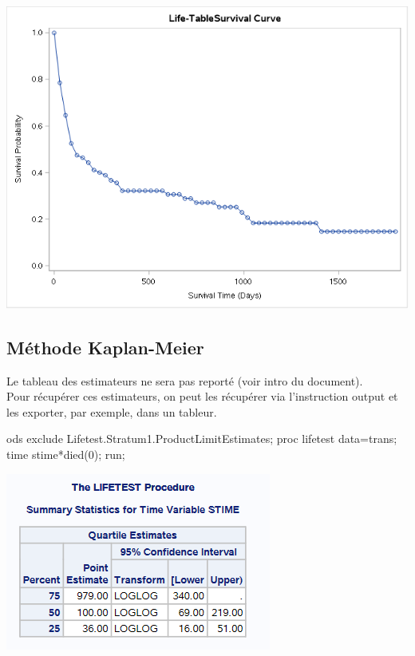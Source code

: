 \documentclass[
  12pt,
  letterpaper,
  DIV=11,
  numbers=noendperiod,
  onepage,
  openany]{scrreprt}
\newenvironment{Shaded}{\begin{snugshade}}{\end{snugshade}}
\newcommand{\DecValTok}[1]{\textcolor[rgb]{0.86,0.86,0.80}{#1}}
\newcommand{\FunctionTok}[1]{\textcolor[rgb]{0.94,0.94,0.56}{#1}}
\newcommand{\NormalTok}[1]{\textcolor[rgb]{0.80,0.80,0.80}{#1}}
\newcommand{\OtherTok}[1]{\textcolor[rgb]{0.94,0.94,0.56}{#1}}
\newcommand{\SpecialCharTok}[1]{\textcolor[rgb]{0.86,0.64,0.64}{#1}}
\begin{document}
\includegraphics{sas/1c.png}

\hypertarget{muxe9thode-kaplan-meier-2}{%
\subsection{Méthode Kaplan-Meier}\label{muxe9thode-kaplan-meier-2}}

Le tableau des estimateurs ne sera pas reporté (voir intro du
document).\\
Pour récupérer ces estimateurs, on peut les récupérer via l'instruction
output et les exporter, par exemple, dans un tableur.

\begin{Shaded}
\begin{Highlighting}[]
\NormalTok{ods exclude Lifetest.Stratum1.ProductLimitEstimates;}
\NormalTok{proc lifetest data}\OtherTok{=}\NormalTok{trans;}
\NormalTok{time stime}\SpecialCharTok{*}\FunctionTok{died}\NormalTok{(}\DecValTok{0}\NormalTok{); run;}
\end{Highlighting}
\end{Shaded}

\includegraphics{sas/2a.PNG}
\end{document}
